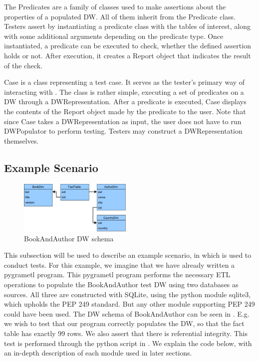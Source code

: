 The Predicates are a family of classes used to make assertions about the properties of a populated DW. All of them inherit from the Predicate class. Testers assert by instantiating a predicate class with the tables of interest, along with some additional arguments depending on the predicate type. Once instantiated, a predicate can be executed to check, whether the defined assertion holds or not. After execution, it creates a Report object that indicates the result of the check.

Case is a class representing a test case. It serves as the tester’s primary way of interacting with \FW{}. The class is rather simple, executing a set of predicates on a DW through a DWRepresentation. After a predicate is executed, Case displays the contents of the Report object made by the predicate to the user.  Note that since Case takes a DWRepresentation as input, the user does not have to run DWPopulator to perform testing. Testers may construct a DWRepresentation themselves.

\subsection{Example Scenario}

\begin{figure}
\centering
\includegraphics[width=0.48\textwidth]{figures/example_dw.pdf}
\caption{BookAndAuthor DW schema}
\label{fig:exdw}
\end{figure}

This subsection will be used to describe an example scenario, in which \FW{} is used to conduct tests. For this example, we imagine that we have already written a pygrametl program. This pygrametl program performs the necessary ETL operations to populate the BookAndAuthor test DW using two databases as sources. All three are constructed with SQLite, using the python module sqlite3, which upholds the PEP 249 standard. But any other module supporting PEP 249 could have been used. The DW schema of BookAndAuthor can be seen in . E.g. we wish to test that our program correctly populates the DW, so that the fact table has exactly 99 rows. We also assert that there is referential integrity. This test is performed through the python script in . We explain the code below, with an in-depth description of each module used in later sections.

